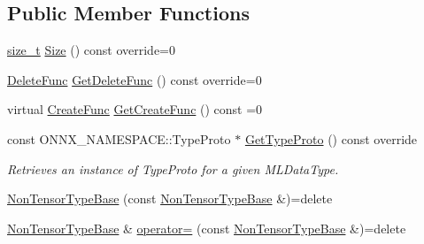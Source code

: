 \subsection*{Public Member Functions}
\begin{DoxyCompactItemize}
\item 
\mbox{\hyperlink{mlasi_8h_a503efbc1c6e50825320ad909366b78ab}{size\+\_\+t}} \mbox{\hyperlink{classonnxruntime_1_1NonTensorTypeBase_ab81811ddad81a55603074f90c4297d56}{Size}} () const override=0
\item 
\mbox{\hyperlink{namespaceonnxruntime_a8dcea0e1aa8476e3d09d5a44a0ca4516}{Delete\+Func}} \mbox{\hyperlink{classonnxruntime_1_1NonTensorTypeBase_a09fc84f1ff38aa3bc4752a7560fcf902}{Get\+Delete\+Func}} () const override=0
\item 
virtual \mbox{\hyperlink{namespaceonnxruntime_a4e4e007092b50ccad0f64e24d7ac3c1e}{Create\+Func}} \mbox{\hyperlink{classonnxruntime_1_1NonTensorTypeBase_a770380dc6cea2aeaa02ab04c401f3018}{Get\+Create\+Func}} () const =0
\item 
const O\+N\+N\+X\+\_\+\+N\+A\+M\+E\+S\+P\+A\+C\+E\+::\+Type\+Proto $\ast$ \mbox{\hyperlink{classonnxruntime_1_1NonTensorTypeBase_a374c7577231883af5e7534c948587bf8}{Get\+Type\+Proto}} () const override
\begin{DoxyCompactList}\small\item\em Retrieves an instance of Type\+Proto for a given M\+L\+Data\+Type. \end{DoxyCompactList}\item 
\mbox{\hyperlink{classonnxruntime_1_1NonTensorTypeBase_a2066682e7223c4d4a80943d79bc3768c}{Non\+Tensor\+Type\+Base}} (const \mbox{\hyperlink{classonnxruntime_1_1NonTensorTypeBase}{Non\+Tensor\+Type\+Base}} \&)=delete
\item 
\mbox{\hyperlink{classonnxruntime_1_1NonTensorTypeBase}{Non\+Tensor\+Type\+Base}} \& \mbox{\hyperlink{classonnxruntime_1_1NonTensorTypeBase_ada34723664c7b478752b1a562eaa86d2}{operator=}} (const \mbox{\hyperlink{classonnxruntime_1_1NonTensorTypeBase}{Non\+Tensor\+Type\+Base}} \&)=delete
\end{DoxyCompactItemize}
